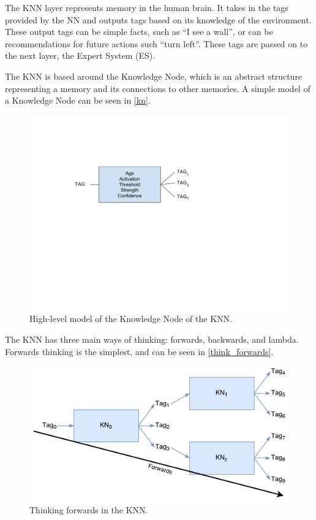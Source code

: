 \documentclass[titlepage,11pt]{article}
\newcommand{\ar}[1]{\autoref{#1}}
\begin{document}
The KNN layer represents memory in the human brain. It takes in the tags provided by the NN and outputs tags based on its knowledge of the environment. These output tags can be simple facts, such as ``I see a wall'', or can be recommendations for future actions such ``turn left''. These tags are passed on to the next layer, the Expert System (ES).

The KNN is based around the Knowledge Node, which is an abstract structure representing a memory and its connections to other memories. A simple model of a Knowledge Node can be seen in \ar{kn}.

\begin{figure}[!htb]
	\includegraphics[width=\columnwidth]{figures/kn.pdf}
	\caption{High-level model of the Knowledge Node of the KNN. \cite{vybihal-knowledge}}
	\label{kn}
\end{figure}

The KNN has three main ways of thinking: forwards, backwards, and lambda. Forwards thinking is the simplest, and can be seen in \autoref{think_forwards}.

\begin{figure}[!htb]
	\includegraphics[width=\columnwidth]{figures/forwards_thinking.pdf}
	\caption{Thinking forwards in the KNN.}
	\label{think_forwards}
\end{figure}
\end{document}
